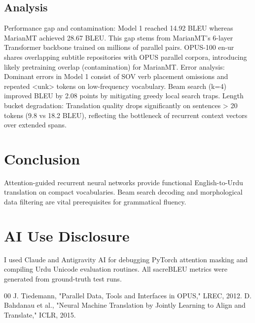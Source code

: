 \documentclass[conference]{IEEEtran}
\begin{document}
\subsection{Analysis}
Performance gap and contamination: Model 1 reached 14.92 BLEU whereas MarianMT achieved 28.67 BLEU. This gap stems from MarianMT's 6-layer Transformer backbone trained on millions of parallel pairs. OPUS-100 en-ur shares overlapping subtitle repositories with OPUS parallel corpora, introducing likely pretraining overlap (contamination) for MarianMT. Error analysis: Dominant errors in Model 1 consist of SOV verb placement omissions and repeated <unk> tokens on low-frequency vocabulary. Beam search (k=4) improved BLEU by 2.08 points by mitigating greedy local search traps. Length bucket degradation: Translation quality drops significantly on sentences > 20 tokens (9.8 vs 18.2 BLEU), reflecting the bottleneck of recurrent context vectors over extended spans.

\section{Conclusion}
Attention-guided recurrent neural networks provide functional English-to-Urdu translation on compact vocabularies. Beam search decoding and morphological data filtering are vital prerequisites for grammatical fluency.

\section*{AI Use Disclosure}
I used Claude and Antigravity AI for debugging PyTorch attention masking and compiling Urdu Unicode evaluation routines. All sacreBLEU metrics were generated from ground-truth test runs.

\begin{thebibliography}{00}
 J. Tiedemann, "Parallel Data, Tools and Interfaces in OPUS," LREC, 2012.
 D. Bahdanau et al., "Neural Machine Translation by Jointly Learning to Align and Translate," ICLR, 2015.
\end{thebibliography}
\end{document}
